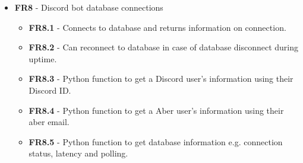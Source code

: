 \begin{itemize}
	\item \textbf{FR8} - Discord bot database connections
	\begin{itemize}
		\item \textbf{FR8.1} - Connects to database and returns information on connection.
		\item \textbf{FR8.2} - Can reconnect to database in case of database disconnect during uptime.
		\item \textbf{FR8.3} - Python function to get a Discord user's information using their Discord ID.
		\item \textbf{FR8.4} - Python function to get a Aber user's information using their aber email.
		\item \textbf{FR8.5} - Python function to get database information e.g. connection status, latency and polling.
	\end{itemize}
\end{itemize}

